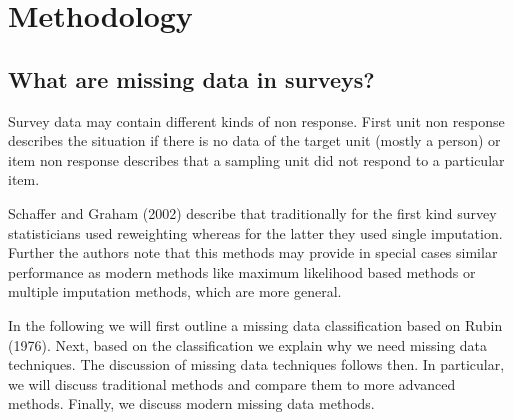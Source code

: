\section{Methodology}

\subsection{What are missing data in surveys?}

Survey data may contain different kinds of non response. First unit non response describes the situation if there is no data of the target unit (mostly a person) or item non response describes that a sampling unit did not respond to a particular item. \par
Schaffer and Graham (2002) describe that traditionally for the first kind survey statisticians used reweighting whereas for the latter they used single imputation.
Further the authors note that this methods may provide in special cases similar performance as modern methods like maximum likelihood based methods or multiple imputation methods, which are more general. \par
In the following we will first outline a missing data classification based on Rubin (1976). 
Next, based on the classification we explain why we need missing data techniques. 
The discussion of missing data techniques follows then. In particular, we will discuss traditional methods and compare them to more advanced methods. 
Finally, we discuss modern missing data methods. \par

